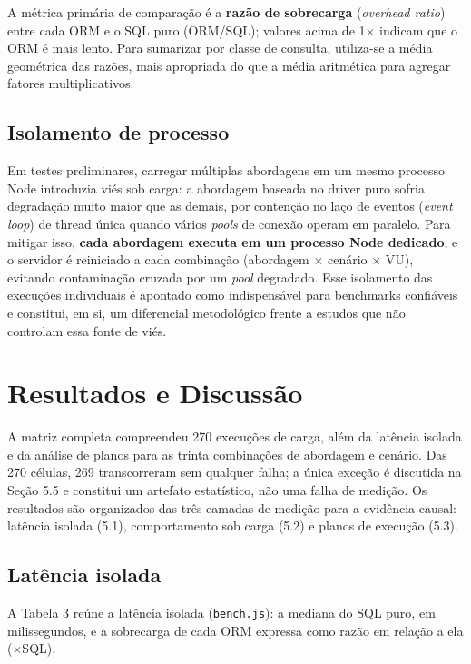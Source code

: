 \documentclass[12pt]{article}
\begin{document}
A métrica primária de comparação é a \textbf{razão de sobrecarga}
(\textit{overhead ratio}) entre cada ORM e o SQL puro (ORM/SQL); valores
acima de 1$\times$ indicam que o ORM é mais lento. Para sumarizar por
classe de consulta, utiliza-se a média geométrica das razões, mais
apropriada do que a média aritmética para agregar fatores
multiplicativos.

\subsection{Isolamento de processo}

Em testes preliminares, carregar múltiplas abordagens em um mesmo
processo Node introduzia viés sob carga: a abordagem baseada no driver
puro sofria degradação muito maior que as demais, por contenção no laço
de eventos (\textit{event loop}) de thread única quando vários
\textit{pools} de conexão operam em paralelo. Para mitigar isso,
\textbf{cada abordagem executa em um processo Node dedicado}, e o servidor
é reiniciado a cada combinação (abordagem $\times$ cenário $\times$ VU),
evitando contaminação cruzada por um \textit{pool} degradado. Esse
isolamento das execuções individuais é apontado como indispensável para
benchmarks confiáveis \cite{beyer2017} e constitui, em si, um diferencial
metodológico frente a estudos que não controlam essa fonte de viés.

\section{Resultados e Discussão}

A matriz completa compreendeu 270 execuções de carga, além da latência
isolada e da análise de planos para as trinta combinações de abordagem e
cenário. Das 270 células, 269 transcorreram sem qualquer falha; a única
exceção é discutida na Seção 5.5 e constitui um artefato estatístico, não
uma falha de medição. Os resultados são organizados das três camadas de
medição para a evidência causal: latência isolada (5.1), comportamento
sob carga (5.2) e planos de execução (5.3).

\subsection{Latência isolada}

A Tabela 3 reúne a latência isolada (\texttt{bench.js}): a mediana do SQL
puro, em milissegundos, e a sobrecarga de cada ORM expressa como razão em
relação a ela ($\times$SQL).
\end{document}
